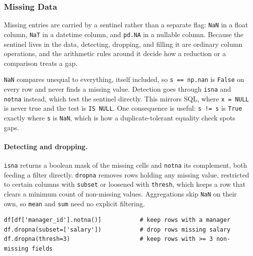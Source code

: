 \subsubsection{Missing Data}

Missing entries are carried by a sentinel rather than a separate flag: \texttt{NaN} in a float column, \texttt{NaT} in a datetime column, and \texttt{pd.NA} in a nullable column. Because the sentinel lives in the data, detecting, dropping, and filling it are ordinary column operations, and the arithmetic rules around it decide how a reduction or a comparison treats a gap.

\vspace{1ex}

\begin{keybox}
\texttt{NaN} compares unequal to everything, itself included, so \texttt{s == np.nan} is \texttt{False} on every row and never finds a missing value. Detection goes through \texttt{isna} and \texttt{notna} instead, which test the sentinel directly. This mirrors SQL, where \texttt{x = NULL} is never true and the test is \texttt{IS NULL}. One consequence is useful: \texttt{s != s} is \texttt{True} exactly where \texttt{s} is \texttt{NaN}, which is how a duplicate-tolerant equality check spots gaps.
\end{keybox}

\vspace{-2ex}

\paragraph{Detecting and dropping.} \texttt{isna} returns a boolean mask of the missing cells and \texttt{notna} its complement, both feeding a filter directly. \texttt{dropna} removes rows holding any missing value, restricted to certain columns with \texttt{subset} or loosened with \texttt{thresh}, which keeps a row that clears a minimum count of non-missing values. Aggregations skip \texttt{NaN} on their own, so \texttt{mean} and \texttt{sum} need no explicit filtering.

\begin{lstlisting}[style=python, caption={Detect, filter, and drop missing values}]
df[df['manager_id'].notna()]           # keep rows with a manager
df.dropna(subset=['salary'])           # drop rows missing salary
df.dropna(thresh=3)                    # keep rows with >= 3 non-missing fields
\end{lstlisting}

